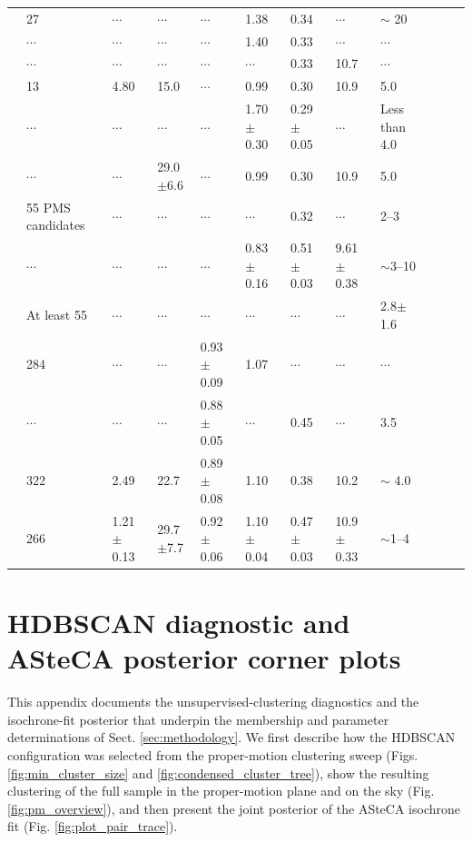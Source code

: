 \documentclass{aa}
\begin{document}
\begin{appendix}
\begin{table}
{\begin{tabular}{llllllllllll}
\citet{1991MNRAS.249...76B} & 27 & $\cdots$ & $\cdots$ & $\cdots$ & 1.38 & 0.34 & $\cdots$ & $\sim$ 20\\
\citet{1994RMxAA..29..141F} & $\cdots$ & $\cdots$ & $\cdots$ & $\cdots$ & 1.40 & 0.33 & $\cdots$ & $\cdots$\\
\citet{2003AA...407..925R} & $\cdots$ & $\cdots$ & $\cdots$ & $\cdots$ & $\cdots$ & 0.33 & 10.7 & $\cdots$\\
\citet{2005AA...438.1163K} & 13 & 4.80 & 15.0 & $\cdots$ & 0.99 & 0.30 & 10.9 & 5.0\\
\citet{2007AA...462..157P} & $\cdots$ & $\cdots$ & $\cdots$ & $\cdots$ & 1.70$\pm$0.30 & 0.29$\pm$0.05 & $\cdots$ & Less than 4.0\\
\citet{2008AA...477..165P} & $\cdots$ & $\cdots$ & 29.0$\pm$6.6 & $\cdots$ & 0.99 & 0.30 & 10.9 & 5.0\\
\citet{2010AA...511A..25R} & 55 PMS candidates & $\cdots$ & $\cdots$ & $\cdots$ & $\cdots$ & 0.32 & $\cdots$ & 2--3\\
\citet{2018AA...610A..30A} & $\cdots$ & $\cdots$ & $\cdots$ & $\cdots$ & 0.83$\pm$0.16 & 0.51$\pm$0.03 & 9.61$\pm$0.38 & $\sim$3--10\\
\citet{2019MNRAS.484.5102K} & At least 55 & $\cdots$ & $\cdots$ & $\cdots$ & $\cdots$ & $\cdots$ & $\cdots$ & 2.8$\pm$1.6\\
\citet{2021ApJ...923..129J} & 284 & $\cdots$ & $\cdots$ & 0.93$\pm$0.09 & 1.07 & $\cdots$ & $\cdots$ & $\cdots$\\
\citet{2022ApJS..262....7H} & $\cdots$ & $\cdots$ & $\cdots$ & 0.88$\pm$0.05 & $\cdots$ & 0.45 & $\cdots$ & 3.5\\
\citet{2024arXiv240305143H} & 322 & 2.49 & 22.7 & 0.89$\pm$0.08 & 1.10 & 0.38 & 10.2 & $\sim$ 4.0\\
\citet{2024arXiv240301030P} & 266 & 1.21$\pm$0.13 & 29.7$\pm$7.7 & 0.92$\pm$0.06 & 1.10$\pm$0.04 & 0.47$\pm$0.03 & 10.9$\pm$0.33 & $\sim$1--4\\
\hline
\end{tabular}}
\end{table}

\section{HDBSCAN diagnostic and ASteCA posterior corner plots}\label{app:hdbscan}

This appendix documents the unsupervised-clustering diagnostics and the isochrone-fit posterior that underpin the membership and parameter determinations of Sect. \ref{sec:methodology}. We first describe how the HDBSCAN configuration was selected from the proper-motion clustering sweep (Figs. \ref{fig:min_cluster_size} and \ref{fig:condensed_cluster_tree}), show the resulting clustering of the full sample in the proper-motion plane and on the sky (Fig. \ref{fig:pm_overview}), and then present the joint posterior of the ASteCA isochrone fit (Fig. \ref{fig:plot_pair_trace}).


\end{appendix}
\end{document}
